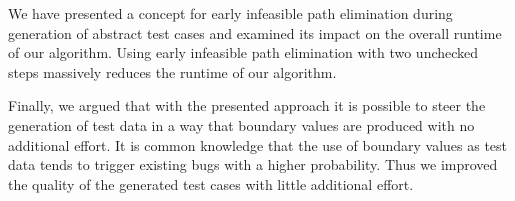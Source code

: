 \documentclass[runningheads,a4paper]{llncs}%
\begin{document}
We have presented a concept for early infeasible path elimination during
generation of abstract test cases and examined its impact on the overall runtime
of our algorithm. Using early infeasible path elimination with two unchecked
steps massively reduces the runtime of our algorithm.

Finally, we argued that with the presented approach it is possible to steer the
generation of test data in a way that boundary values are produced with no
additional effort. It is common knowledge that the use of boundary values as
test data tends to trigger existing bugs with a higher probability. Thus we
improved the quality of the generated test cases with little additional effort.%
%
%
\end{document}
